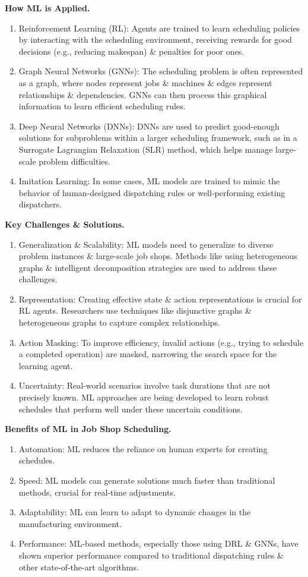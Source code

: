 \documentclass{article}
\begin{document}
{\bf How ML is Applied.}
\begin{enumerate}
    \item Reinforcement Learning (RL):
    Agents are trained to learn scheduling policies by interacting with the scheduling environment, receiving rewards for good decisions (e.g., reducing makespan) \& penalties for poor ones.
    \item Graph Neural Networks (GNNs):
    The scheduling problem is often represented as a graph, where nodes represent jobs \& machines \& edges represent relationships \& dependencies. GNNs can then process this graphical information to learn efficient scheduling rules.
    \item Deep Neural Networks (DNNs):
    DNNs are used to predict good-enough solutions for subproblems within a larger scheduling framework, such as in a Surrogate Lagrangian Relaxation (SLR) method, which helps manage large-scale problem difficulties.
    \item Imitation Learning:
    In some cases, ML models are trained to mimic the behavior of human-designed dispatching rules or well-performing existing dispatchers.
\end{enumerate}
{\bf Key Challenges \& Solutions.}
\begin{enumerate}
    \item Generalization \& Scalability:
    ML models need to generalize to diverse problem instances \& large-scale job shops. Methods like using heterogeneous graphs \& intelligent decomposition strategies are used to address these challenges.
    \item Representation:
    Creating effective state \& action representations is crucial for RL agents. Researchers use techniques like disjunctive graphs \& heterogeneous graphs to capture complex relationships.
    \item Action Masking:  To improve efficiency, invalid actions (e.g., trying to schedule a completed operation) are masked, narrowing the search space for the learning agent.
    \item Uncertainty: Real-world scenarios involve task durations that are not precisely known. ML approaches are being developed to learn robust schedules that perform well under these uncertain conditions.
\end{enumerate}
{\bf Benefits of ML in Job Shop Scheduling.}
\begin{enumerate}
    \item Automation: ML reduces the reliance on human experts for creating schedules.
    \item Speed: ML models can generate solutions much faster than traditional methods, crucial for real-time adjustments.
    \item Adaptability: ML can learn to adapt to dynamic changes in the manufacturing environment.
    \item Performance: ML-based methods, especially those using DRL \& GNNs, have shown superior performance compared to traditional dispatching rules \& other state-of-the-art algorithms.
\end{enumerate}
\end{document}
